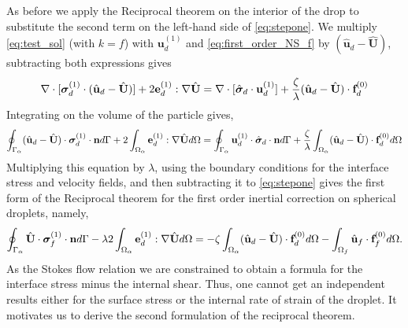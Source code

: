As before we apply the Reciprocal theorem on the interior of the drop to substitute the second term on the left-hand side of \ref{eq:stepone}. 
We multiply \ref{eq:test_sol} (with $k = f$) with $\textbf{u}_d^{(1)}$ and \ref{eq:first_order_NS_f} by $(\hat{\textbf{u}}_d - \hat{\textbf{U}})$, subtracting both expressions gives
\begin{equation*}
     \mathbf{\nabla}\cdot [\bm\sigma_d^{(1)} \cdot (\hat{\textbf{u}}_d - \hat{\textbf{U}})]
     +2 \textbf{e}_d^{(1)} : \mathbf{\nabla} \hat{\textbf{U}}
     =
     \mathbf{\nabla}\cdot [\hat{\bm\sigma}_d \cdot \textbf{u}_d^{(1)}]
     + \frac{\zeta}{\lambda}(\hat{\textbf{u}}_d - \hat{\textbf{U}}) \cdot \textbf{f}_d^{(0)}
\end{equation*}
Integrating on the volume of the particle gives, 
\begin{equation}
    \intS{ (\hat{\textbf{u}}_d - \hat{\textbf{U}})\cdot \bm\sigma_d^{(1)} \cdot \textbf{n}}
    + 2 \intO{ \textbf{e}_d^{(1)} : \grad \hat{\textbf{U}} }
    =
    \intS{\textbf{u}_d^{(1)}\cdot\hat{\bm\sigma}_d \cdot \textbf{n}} 
    + \frac{\zeta}{\lambda} \intO{(\hat{\textbf{u}}_d - \hat{\textbf{U}}) \cdot \textbf{f}_d^{(0)}}
    \label{eq:reci_interior}
\end{equation}
Multiplying this equation by $\lambda$, using the boundary conditions  for the interface stress and velocity fields, and then subtracting it to \ref{eq:stepone} gives the first form of the Reciprocal theorem for the first order inertial correction on spherical droplets, namely,
\begin{equation}
    \intS{\hat{\textbf{U}}\cdot  \bm\sigma_f^{(1)} \cdot \textbf{n}}
    -\lambda 2 \intO{ \textbf{e}_d^{(1)} : \grad \hat{\textbf{U}} }
    = 
    - \zeta \intO{(\hat{\textbf{u}}_d - \hat{\textbf{U}}) \cdot \textbf{f}_d^{(0)}}
    - \intOf{\hat{\textbf{u}}_f\cdot  \textbf{f}^{(0)}_f}.
    \label{eq:reciprocal_f_one}
\end{equation}
As the Stokes flow relation we are constrained to obtain a formula for the interface stress minus the internal shear.
Thus, one cannot get an independent results either for the surface stress or the internal rate of strain of the droplet.  
It motivates us to derive the second formulation of the reciprocal theorem.

